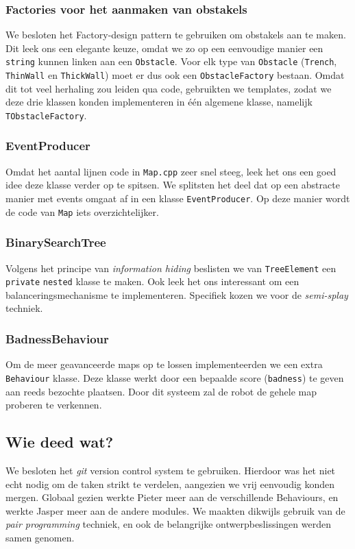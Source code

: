 \documentclass[a4paper]{article}
\begin{document}
\subsubsection*{Factories voor het aanmaken van obstakels}
We besloten het Factory-design pattern te gebruiken om obstakels aan te maken.
Dit leek ons een elegante keuze, omdat we zo op een eenvoudige manier een
\verb#string# kunnen linken aan een \verb#Obstacle#. Voor elk type van
\verb#Obstacle# (\verb#Trench#, \verb#ThinWall# en \verb#ThickWall#) moet er
dus ook een \verb#ObstacleFactory# bestaan. Omdat dit tot veel herhaling zou
leiden qua code, gebruikten we templates, zodat we deze drie klassen konden
implementeren in \'e\'en algemene klasse, namelijk \verb#TObstacleFactory#.

\subsubsection*{EventProducer}
Omdat het aantal lijnen code in \verb#Map.cpp# zeer snel steeg, leek het ons een
goed idee deze klasse verder op te spitsen. We splitsten het deel dat op een
abstracte manier met events omgaat af in een klasse \verb#EventProducer#. Op
deze manier wordt de code van \verb#Map# iets overzichtelijker.

\subsubsection*{BinarySearchTree}
Volgens het principe van \emph{information hiding} beslisten we van
\verb#TreeElement# een \verb#private# \verb#nested# klasse te maken. Ook leek
het ons interessant om een balanceringsmechanisme te implementeren. Specifiek
kozen we voor de \emph{semi-splay} techniek.

\subsubsection*{BadnessBehaviour}
Om de meer geavanceerde maps op te lossen implementeerden we een extra
\verb#Behaviour# klasse. Deze klasse werkt door een bepaalde score
(\verb#badness#) te geven aan reeds bezochte plaatsen. Door dit systeem zal
de robot de gehele map proberen te verkennen.

\subsection*{Wie deed wat?}
We besloten het \emph{git} version control system te gebruiken. Hierdoor was het
niet echt nodig om de taken strikt te verdelen, aangezien we vrij eenvoudig
konden mergen. Globaal gezien werkte Pieter meer aan de verschillende
Behaviours, en werkte Jasper meer aan de andere modules. We maakten dikwijls
gebruik van de \emph{pair programming} techniek, en ook de belangrijke
ontwerpbeslissingen werden samen genomen.
\end{document}
